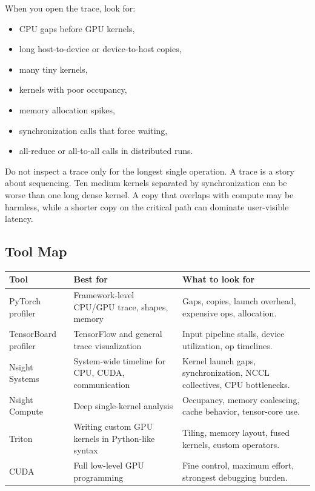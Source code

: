 When you open the trace, look for:

\begin{itemize}[leftmargin=*]
  \item CPU gaps before GPU kernels,
  \item long host-to-device or device-to-host copies,
  \item many tiny kernels,
  \item kernels with poor occupancy,
  \item memory allocation spikes,
  \item synchronization calls that force waiting,
  \item all-reduce or all-to-all calls in distributed runs.
\end{itemize}

Do not inspect a trace only for the longest single operation. A trace is a story about sequencing. Ten medium kernels separated by synchronization can be worse than one long dense kernel. A copy that overlaps with compute may be harmless, while a shorter copy on the critical path can dominate user-visible latency.

\subsection{Tool Map}

\begin{longtable}{p{}p{}p{}}
\toprule
Tool & Best for & What to look for \\
\midrule
PyTorch profiler & Framework-level CPU/GPU trace, shapes, memory & Gaps, copies, launch overhead, expensive ops, allocation. \\
TensorBoard profiler & TensorFlow and general trace visualization & Input pipeline stalls, device utilization, op timelines. \\
Nsight Systems & System-wide timeline for CPU, CUDA, communication & Kernel launch gaps, synchronization, NCCL collectives, CPU bottlenecks. \\
Nsight Compute & Deep single-kernel analysis & Occupancy, memory coalescing, cache behavior, tensor-core use. \\
Triton & Writing custom GPU kernels in Python-like syntax & Tiling, memory layout, fused kernels, custom operators. \\
CUDA & Full low-level GPU programming & Fine control, maximum effort, strongest debugging burden. \\
\bottomrule
\end{longtable}


